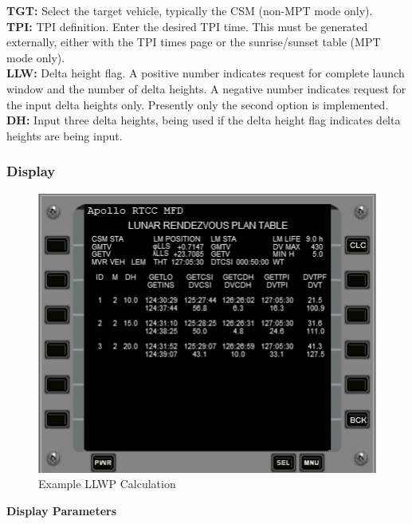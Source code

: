 \documentclass[11pt]{article} %
\begin{document}
\textbf{TGT:} Select the target vehicle, typically the CSM (non-MPT mode only).\\
\textbf{TPI:} TPI definition. Enter the desired TPI time. This must be generated externally, either with the TPI times page or the sunrise/sunset table (MPT mode only).\\
\textbf{LLW:} Delta height flag. A positive number indicates request for complete launch window and the number of delta heights. A negative number indicates request for the input delta heights only. Presently only the second option is implemented.\\
\textbf{DH:} Input three delta heights, being used if the delta height flag indicates delta heights are being input.\\
\subsubsection{Display}

\begin{figure}[hp]
	\centering
		\includegraphics{./ApolloRTCCMFDFiles/RTCCMFD_LLWP_Display.png}
	\caption{Example LLWP Calculation}
	\label{fig:LLWPDisplay}
\end{figure}
\textbf{Display Parameters}\\
\end{document}
